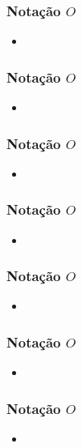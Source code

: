 \documentclass[aspectratio=169]{beamer}
\begin{document}
\begin{frame}\frametitle{Notação $O$}
\begin{itemize}
	\item 
\end{itemize}
\end{frame}

\begin{frame}\frametitle{Notação $O$}
\begin{itemize}
	\item 
\end{itemize}
\end{frame}

\begin{frame}\frametitle{Notação $O$}
\begin{itemize}
	\item 
\end{itemize}
\end{frame}

\begin{frame}\frametitle{Notação $O$}
\begin{itemize}
	\item 
\end{itemize}
\end{frame}

\begin{frame}\frametitle{Notação $O$}
\begin{itemize}
	\item 
\end{itemize}
\end{frame}

\begin{frame}\frametitle{Notação $O$}
\begin{itemize}
	\item 
\end{itemize}
\end{frame}

\begin{frame}\frametitle{Notação $O$}
\begin{itemize}
	\item 
\end{itemize}
\end{frame}
\end{document}
